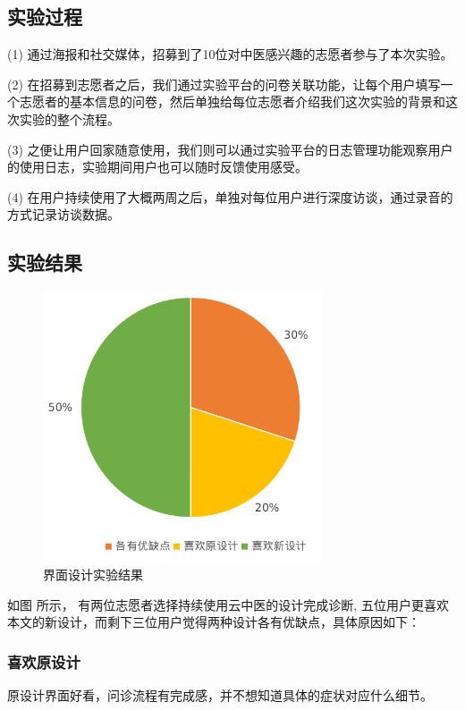 \subsection{实验过程}

(1) 通过海报和社交媒体，招募到了10位对中医感兴趣的志愿者参与了本次实验。

(2) 在招募到志愿者之后，我们通过实验平台的问卷关联功能，让每个用户填写一个志愿者的基本信息的问卷，然后单独给每位志愿者介绍我们这次实验的背景和这次实验的整个流程。

(3) 之便让用户回家随意使用，我们则可以通过实验平台的日志管理功能观察用户的使用日志，实验期间用户也可以随时反馈使用感受。

(4)  在用户持续使用了大概两周之后，单独对每位用户进行深度访谈，通过录音的方式记录访谈数据。



\subsection{实验结果}


\begin{figure}[ht]
    \centering
    \includegraphics[height=8cm]{images/ui-exp.png}
    \caption{界面设计实验结果}
    \label{fig:ui-exp}
\end{figure}

如图 \cite{fig:ui-exp}所示， 有两位志愿者选择持续使用云中医的设计完成诊断, 五位用户更喜欢本文的新设计，而剩下三位用户觉得两种设计各有优缺点，具体原因如下：

\subsubsection{喜欢原设计}

原设计界面好看，问诊流程有完成感，并不想知道具体的症状对应什么细节。

